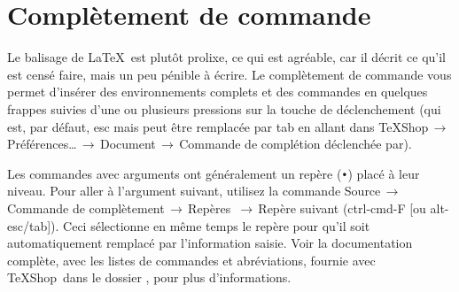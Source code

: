 \documentclass[11pt,french]{article}
\newcommand{\TS}{\textsf{\TeX Shop}}
\newcommand{\cmd}[1]{\textsf{#1}}
\newcommand{\mnu}[1]{\textsf{#1}}
\newcommand{\To}{\,\(\to\)\,}
\begin{document}


\section{Complètement de commande}\label{secCC}

Le balisage de \LaTeX\ est plutôt prolixe, ce qui est agréable, car il décrit ce qu'il est censé faire, mais un peu pénible à écrire. Le complètement de commande vous permet d'insérer des environnements complets et des commandes en quelques frappes suivies d'une ou plusieurs pressions  sur la touche de déclenchement (qui est, par défaut, \cmd{esc} mais peut être remplacée par \cmd{tab} en allant dans \mnu{TeXShop}\To\mnu{Préférences…}\To\mnu{Document}\To\mnu{Commande de complétion déclenchée par}).

Les commandes avec arguments ont généralement un repère (\texttt{•}) placé à leur niveau. Pour aller à l'argument suivant, utilisez la commande \mnu{Source}\To\mnu{Commande de complètement}\To\mnu{Repères} \To\mnu{Repère suivant} (\cmd{ctrl-cmd-F} [ou \cmd{alt-esc/tab}]). Ceci sélectionne en même temps le repère pour qu'il soit automatiquement remplacé par l'information saisie. Voir la documentation complète, avec les listes de commandes et abréviations, fournie avec \TS\ dans le dossier , pour plus d'informations.


\end{document}
